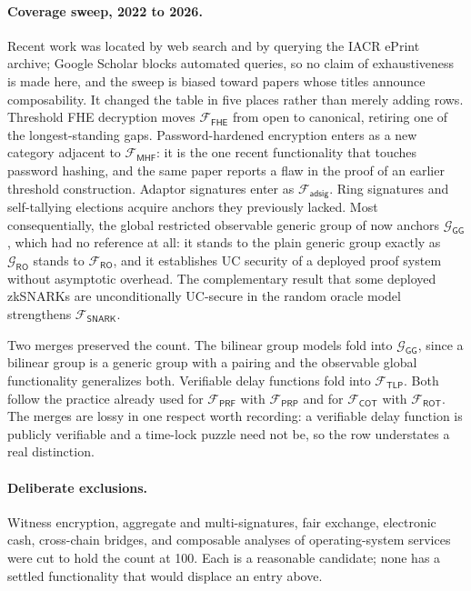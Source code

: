 \documentclass[11pt,a4paper]{article}
\newcommand{\Func}[1]{\ensuremath{\mathcal{F}_{\mathsf{#1}}}}
\newcommand{\GFunc}[1]{\ensuremath{\mathcal{G}_{\mathsf{#1}}}}
\begin{document}
\paragraph{Coverage sweep, 2022 to 2026.}
Recent work was located by web search and by querying the IACR ePrint archive;
Google Scholar blocks automated queries, so no claim of exhaustiveness is made
here, and the sweep is biased toward papers whose titles announce composability.
It changed the table in five places rather than merely adding rows. Threshold
FHE decryption \cite{zzlp25} moves \Func{FHE} from open to canonical, retiring one
of the longest-standing gaps. Password-hardened encryption \cite{abgg25} enters
as a new category adjacent to \Func{MHF}: it is the one
recent functionality that touches password hashing, and the same paper reports a
flaw in the proof of an earlier threshold construction. Adaptor signatures
\cite{grs25} enter as \Func{adsig}. Ring signatures \cite{yo07,bdw22} and
self-tallying elections \cite{ecclesia25} acquire anchors they previously
lacked. Most consequentially, the global restricted observable generic group of
\cite{bfkt24} now anchors \GFunc{GG}, which had no reference at all: it stands to
the plain generic group exactly as \GFunc{RO} stands to \Func{RO}, and it
establishes UC security of a deployed proof system without asymptotic overhead.
The complementary result that some deployed zkSNARKs are unconditionally
UC-secure in the random oracle model \cite{cf24} strengthens \Func{SNARK}.

Two merges preserved the count. The bilinear group models fold into \GFunc{GG},
since a bilinear group is a generic group with a pairing and the observable
global functionality generalizes both. Verifiable delay functions fold into
\Func{TLP}. Both follow the practice already used for
\Func{PRF} with \Func{PRP} and for \Func{COT} with \Func{ROT}. The merges are
lossy in one respect worth recording: a verifiable delay function is publicly
verifiable and a time-lock puzzle need not be, so the row understates a real
distinction.

\paragraph{Deliberate exclusions.}
Witness encryption, aggregate and multi-signatures, fair exchange, electronic
cash, cross-chain bridges, and composable analyses of operating-system
services \cite{cplus11} were cut to hold the count at 100. Each is a
reasonable candidate; none has a settled functionality that would displace an
entry above.
\end{document}
